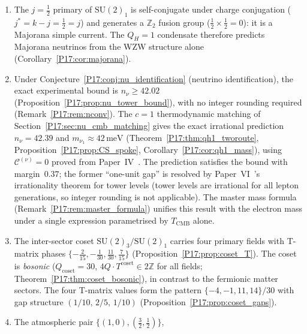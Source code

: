 \documentclass[11pt,a4paper]{article}
\theoremstyle{definition}\newtheorem{definition}[theorem]{Definition}
\theoremstyle{remark}
\newcommand{\vp}{\varphi}
\newcommand{\Ja}{J_{2a}}
\newcommand{\Jfour}{J_4}
\newcommand{\TCMB}{T_{\mathrm{CMB}}}
\newcommand{\SU}{\mathrm{SU}}
\newcommand{\QH}{Q_H}
\newcommand{\Ztwo}{\mathbb{Z}_2}
\begin{document}
\begin{enumerate}[noitemsep]
  (not $\vp$), and the profile ratio changes to
  $\Jfour^{(\nu)}/\Ja^{(\nu)}=(1+\sqrt{3}/\vp)\cdot2^{1/3}/\vp^6\approx0.145$
  (Proposition~\ref{P17:prop:k1_virial}).  The thin-torus normalization identity at $k=1$
  gives $5\vp\sqrt{2/(\vp+\sqrt{3})}\approx6.25=6\cdot[1+O(R_0^{-2})]$
  (Proposition~\ref{P17:prop:norm_id_k1}), consistent with two-route
  equivalence holding at $k=1$ and the mass prediction
  $m_{\nu_1}\approx42\,\mathrm{meV}$ remaining unchanged
  (Corollary~\ref{P17:cor:two_route_k1}).
\item The $j=\tfrac12$ primary of $\mathrm{SU}(2)_1$ is self-conjugate
  under charge conjugation ($j^*=k-j=\tfrac12=j$) and generates a
  $\Ztwo$ fusion group ($\tfrac12\times\tfrac12=0$): it is a Majorana
  simple current.  The $\QH=1$ condensate therefore predicts Majorana
  neutrinos from the WZW structure alone
  (Corollary~\ref{P17:cor:majorana}).
\item Under Conjecture~\ref{P17:conj:nu_identification} (neutrino
  identification), the exact experimental bound is $n_\nu\geq42.02$
  (Proposition~\ref{P17:prop:nu_tower_bound}), with no integer rounding required
  (Remark~\ref{P17:rem:nconv}).  The $c=1$ thermodynamic
  matching of Section~\ref{P17:sec:nu_cmb_matching} gives the exact
  irrational prediction $n_\nu=42.39$ and $m_{\nu_1}\approx42\,\mathrm{meV}$
  (Theorem~\ref{P17:thm:qh1_tworoute}, Proposition~\ref{P17:prop:CS_spoke},
  Corollary~\ref{P17:cor:qh1_mass}), using $\mathcal{C}^{(\nu)}=0$ proved
  from Paper~IV~\cite{Paper4}.  The prediction satisfies the bound
  with margin~$0.37$; the former ``one-unit gap'' is resolved by
  Paper~VI~\cite{Paper6}'s irrationality theorem for tower levels
  (tower levels are irrational for all lepton generations, so integer
  rounding is not applicable).  The master mass formula
  (Remark~\ref{P17:rem:master_formula}) unifies this result with the
  electron mass under a single expression parametrised by $\TCMB$ alone.
\item The inter-sector coset $\SU(2)_3/\SU(2)_1$ carries four primary
  fields with T-matrix phases
  $\{-\frac{2}{15},-\frac{1}{30},\frac{11}{30},\frac{7}{15}\}$
  (Proposition~\ref{P17:prop:coset_T}). The coset is \emph{bosonic}
  ($Q_{\mathrm{coset}}=30$, $4Q\cdot T^{\mathrm{coset}}\in2\mathbb{Z}$
  for all fields; Theorem~\ref{P17:thm:coset_bosonic}), in contrast to the
  fermionic matter sectors. The four T-matrix values form the pattern
  $\{-4,-1,11,14\}/30$ with gap structure $(1/10,\,2/5,\,1/10)$
  (Proposition~\ref{P17:prop:coset_gaps}).
\item The atmospheric pair $\{(1,0),(\frac{3}{2},\frac{1}{2})\}$,

\end{enumerate}
\end{document}
